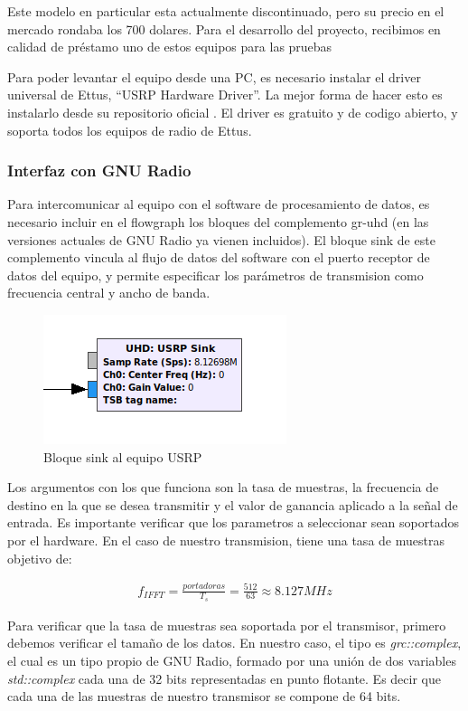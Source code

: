Este modelo en particular esta actualmente discontinuado, pero su precio en el mercado rondaba los 700 dolares. Para el desarrollo del proyecto, recibimos en calidad de préstamo uno de estos equipos para las pruebas

Para poder levantar el equipo desde una PC, es necesario instalar el driver universal de Ettus, “USRP Hardware Driver”. La mejor forma de hacer esto es instalarlo desde su repositorio oficial \cite{UHD}. El driver es gratuito y de codigo abierto, y soporta todos los equipos de radio de Ettus.


\subsubsection{Interfaz con GNU Radio}

Para intercomunicar al equipo con el software de procesamiento de datos, es necesario incluir en el flowgraph los bloques del complemento gr-uhd (en las versiones actuales de GNU Radio ya vienen incluidos). El bloque sink de este complemento vincula al flujo de datos del software con el puerto receptor de datos del equipo, y permite especificar los parámetros de transmision como frecuencia central y ancho de banda.

\begin{figure}[h!]
	\centering
	\includegraphics[scale=0.55]{figuras/cap04/sink_block}
	\caption{\label{f:sink_block} Bloque sink al equipo USRP}
\end{figure}

Los argumentos con los que funciona son la tasa de muestras, la frecuencia de destino en la que se desea transmitir y el valor de ganancia aplicado a la señal de entrada. Es importante verificar que los parametros a seleccionar sean soportados por el hardware. En el caso de nuestro transmision, tiene una tasa de muestras objetivo de:

\begin{gather*}
	f_{IFFT} = \frac{portadoras}{T_{s}} = \frac{512}{63} \approx 8.127 MHz
\end{gather*}

Para verificar que la tasa de muestras sea soportada por el transmisor, primero debemos verificar el tamaño de los datos. En nuestro caso, el tipo es \textit{grc::complex}, el cual es un tipo propio de GNU Radio, formado por una unión de dos variables \textit{std::complex} cada una de 32 bits representadas en punto flotante. Es decir que cada una de las muestras de nuestro transmisor se compone de 64 bits.


